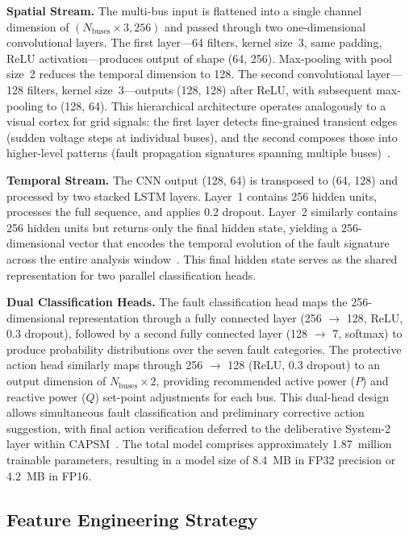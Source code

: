 \documentclass[journal]{IEEEtran}
\begin{document}
\textbf{Spatial Stream.} The multi-bus input is flattened into a single channel dimension of $(N_{\text{buses}} \times 3, 256)$ and passed through two one-dimensional convolutional layers. The first layer---64 filters, kernel size~3, same padding, ReLU activation---produces output of shape (64, 256). Max-pooling with pool size~2 reduces the temporal dimension to 128. The second convolutional layer---128 filters, kernel size~3---outputs (128, 128) after ReLU, with subsequent max-pooling to (128, 64). This hierarchical architecture operates analogously to a visual cortex for grid signals: the first layer detects fine-grained transient edges (sudden voltage steps at individual buses), and the second composes those into higher-level patterns (fault propagation signatures spanning multiple buses)~\cite{ref26}.

\textbf{Temporal Stream.} The CNN output (128, 64) is transposed to (64, 128) and processed by two stacked LSTM layers. Layer~1 contains 256 hidden units, processes the full sequence, and applies 0.2 dropout. Layer~2 similarly contains 256 hidden units but returns only the final hidden state, yielding a 256-dimensional vector that encodes the temporal evolution of the fault signature across the entire analysis window~\cite{ref10}. This final hidden state serves as the shared representation for two parallel classification heads.

\textbf{Dual Classification Heads.} The fault classification head maps the 256-dimensional representation through a fully connected layer (256 $\rightarrow$ 128, ReLU, 0.3 dropout), followed by a second fully connected layer (128 $\rightarrow$ 7, softmax) to produce probability distributions over the seven fault categories. The protective action head similarly maps through 256 $\rightarrow$ 128 (ReLU, 0.3 dropout) to an output dimension of $N_{\text{buses}} \times 2$, providing recommended active power ($P$) and reactive power ($Q$) set-point adjustments for each bus. This dual-head design allows simultaneous fault classification and preliminary corrective action suggestion, with final action verification deferred to the deliberative System-2 layer within CAPSM~\cite{ref15}. The total model comprises approximately 1.87~million trainable parameters, resulting in a model size of 8.4~MB in FP32 precision or 4.2~MB in FP16.

\subsection{Feature Engineering Strategy}
\end{document}
